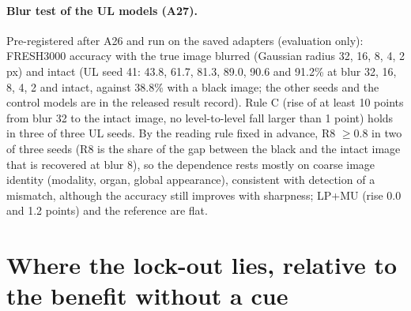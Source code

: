 \begin{table}[tbp]
  \centering
  \footnotesize
  \setlength{\tabcolsep}{2.4pt}
  \caption{\textbf{Price of image use on the real shortcut} (FRESH3000, accuracy in \%, losses in points relative to the true image).}
  \label{tab:price}
\end{table}

\paragraph{Blur test of the UL models (A27).}
Pre-registered after A26 and run on the saved adapters (evaluation only): FRESH3000 accuracy with the true image blurred (Gaussian radius 32, 16, 8, 4, 2 px) and intact (UL seed 41: 43.8, 61.7, 81.3, 89.0, 90.6 and 91.2\% at blur 32, 16, 8, 4, 2 and intact, against 38.8\% with a black image; the other seeds and the control models are in the released result record).
Rule C (rise of at least 10 points from blur 32 to the intact image, no level-to-level fall larger than 1 point) holds in three of three UL seeds.
By the reading rule fixed in advance, R8 $\ge0.8$ in two of three seeds (R8 is the share of the gap between the black and the intact image that is recovered at blur 8), so the dependence rests mostly on coarse image identity (modality, organ, global appearance), consistent with detection of a mismatch, although the accuracy still improves with sharpness; LP+MU (rise 0.0 and 1.2 points) and the reference are flat.


\section{Where the lock-out lies, relative to the benefit without a cue}
\label{app:rel}

